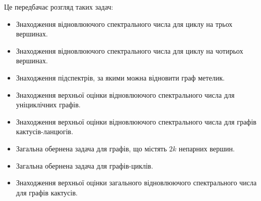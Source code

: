 Це передбачає розгляд таких задач:
\begin{itemize}
\item Знаходження відновлюючого спектрального числа для циклу на трьох вершинах.
\item Знаходження відновлюючого спектрального числа для циклу на чотирьох вершинах.
\item Знаходження підспектрів, за якими  можна відновити граф метелик.
\item Знаходження верхньої оцінки відновлюючого спектрального числа для уніциклічних графів.
\item Знаходження верхньої оцінки відновлюючого спектрального числа для графів кактусів-ланцюгів.
\item Загальна обернена задача для графів, що містять $2k$ непарних вершин.
\item Загальна обернена задача для графів-циклів.
\item Знаходження верхньої оцінки загального відновлюючого спектрального числа для графів кактусів.
\end{itemize}